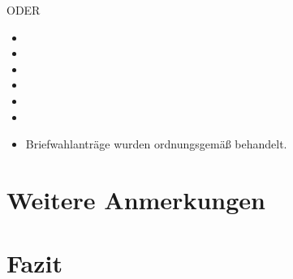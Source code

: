 \documentclass[a4paper]{scrartcl}
\newcommand{\fullcheck}{\raisebox{-.8\dp\strutbox}{\texttt{[image: Check.pdf]}}}
\newcommand{\semicheck}{\raisebox{-.8\dp\strutbox}{\texttt{[image: Semicheck.pdf]}}}
\newcommand{\nocheck}{\raisebox{-.8\dp\strutbox}{\texttt{[image: Nocheck.pdf]}}}
\newcommand{\dontknow}{\raisebox{-.8\dp\strutbox}{\texttt{[image: Dontknow.pdf]}}}
\newcommand{\notrev}{\raisebox{-.8\dp\strutbox}{\texttt{[image: Notrev.pdf]}}}
\newcommand{\sym}[1]{
\ifcase#1 \item[$\Box$]
\or \item[\fullcheck]
\or \item[\semicheck]
\or \item[\nocheck]
\or \item[\dontknow]
\or \item[\notrev]
\else \item[$\Box$]
\fi}
\begin{document}
 ODER
 
\begin{itemize}[label=$\Box$]
\sym{4} Briefwahlanträge wurden ordnungsgemäß behandelt.
\end{itemize}



\section{Weitere Anmerkungen}














\section{Fazit}
\end{document}
